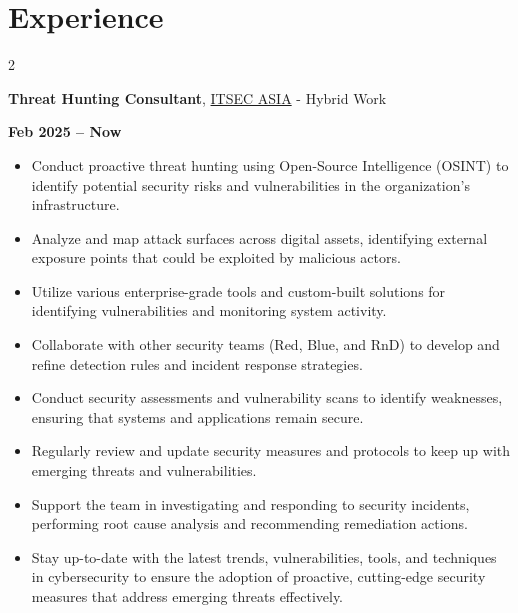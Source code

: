 \documentclass[10pt, letterpaper]{article}
\newenvironment{highlights}{
    \begin{itemize}[
        topsep=0.10 cm,
        parsep=0.10 cm,
        partopsep=0pt,
        itemsep=0pt,
        leftmargin=0 cm + 10pt
    ]
}{
    \end{itemize}
} %
\newenvironment{twocolentry}[2][]{
    \onecolentry
    \def\secondColumn{#2}
    \setcolumnwidth{\fill, 4.5 cm}
    \begin{paracol}{2}
}{
    \switchcolumn \raggedleft \secondColumn
    \end{paracol}
    \endonecolentry
} %
\let\hrefWithoutArrow\href
\begin{document}
    \section{Experience}
          \vspace{0.35 cm}
        \begin{twocolentry}{\textbf{Feb 2025 – Now}}
            \textbf{Threat Hunting Consultant}, \hrefWithoutArrow{https://itsec.asia}{ITSEC ASIA} - Hybrid Work
        \end{twocolentry}

        \vspace{0.10 cm}
        \begin{justify}
            \begin{highlights}
             \item Conduct proactive threat hunting using Open-Source Intelligence (OSINT) to identify potential security risks and vulnerabilities in the organization’s infrastructure.
             
             \item Analyze and map attack surfaces across digital assets, identifying external exposure points that could be exploited by malicious actors.
             
             \item Utilize various enterprise-grade tools and custom-built solutions for identifying vulnerabilities and monitoring system activity.
             
             \item Collaborate with other security teams (Red, Blue, and RnD) to develop and refine detection rules and incident response strategies.
             
             \item Conduct security assessments and vulnerability scans to identify weaknesses, ensuring that systems and applications remain secure.
             
             \item Regularly review and update security measures and protocols to keep up with emerging threats and vulnerabilities.
             
             \item Support the team in investigating and responding to security incidents, performing root cause analysis and recommending remediation actions.
             
             \item Stay up-to-date with the latest trends, vulnerabilities, tools, and techniques in cybersecurity to ensure the adoption of proactive, cutting-edge security measures that address emerging threats effectively.
             
            \end{highlights}
        \end{justify}		
		
\end{document}

